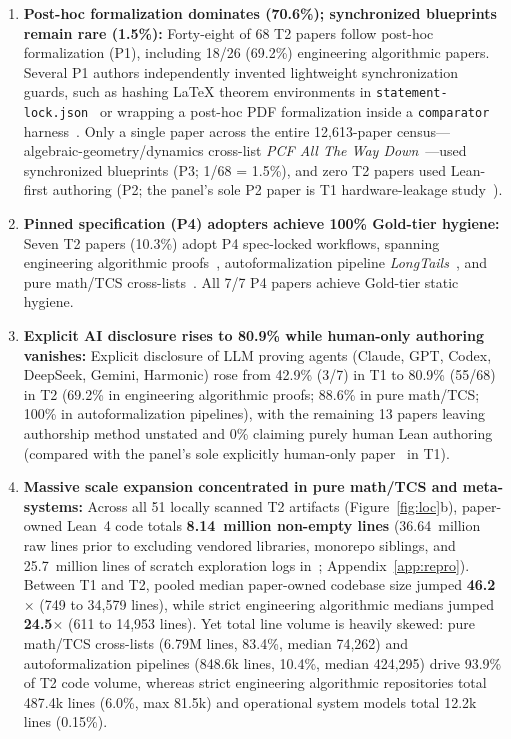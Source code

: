 \documentclass[11pt,letterpaper]{article}
\begin{document}
\begin{enumerate}
  \item \textbf{Post-hoc formalization dominates (70.6\%); synchronized blueprints remain rare (1.5\%):} Forty-eight of 68 T2 papers follow post-hoc formalization (P1), including 18/26 (69.2\%) engineering algorithmic papers. Several P1 authors independently invented lightweight synchronization guards, such as hashing \LaTeX{} theorem environments in \texttt{statement-lock.json}~\cite{arxiv2611_18455} or wrapping a post-hoc PDF formalization inside a \texttt{comparator} harness~\cite{arxiv2611_15201}. Only a single paper across the entire 12,613-paper census---algebraic-geometry/dynamics cross-list \emph{PCF All The Way Down}~\cite{arxiv2611_06106}---used synchronized blueprints (P3; 1/68 = 1.5\%), and zero T2 papers used Lean-first authoring (P2; the panel's sole P2 paper is T1 hardware-leakage study~\cite{arxiv2605_02856}).
  \item \textbf{Pinned specification (P4) adopters achieve 100\% Gold-tier hygiene:} Seven T2 papers (10.3\%) adopt P4 spec-locked workflows, spanning engineering algorithmic proofs~\cite{arxiv2611_04876,arxiv2611_11805,arxiv2611_14475}, autoformalization pipeline \emph{LongTails}~\cite{arxiv2611_13872}, and pure math/TCS cross-lists~\cite{arxiv2611_02465,arxiv2611_12862,arxiv2611_17223}. All 7/7 P4 papers achieve Gold-tier static hygiene.
  \item \textbf{Explicit AI disclosure rises to 80.9\% while human-only authoring vanishes:} Explicit disclosure of LLM proving agents (Claude, GPT, Codex, DeepSeek, Gemini, Harmonic) rose from 42.9\% (3/7) in T1 to 80.9\% (55/68) in T2 (69.2\% in engineering algorithmic proofs; 88.6\% in pure math/TCS; 100\% in autoformalization pipelines), with the remaining 13 papers leaving authorship method unstated and 0\% claiming purely human Lean authoring (compared with the panel's sole explicitly human-only paper~\cite{arxiv2605_14610} in T1).
  \item \textbf{Massive scale expansion concentrated in pure math/TCS and meta-systems:} Across all 51 locally scanned T2 artifacts (Figure~\ref{fig:loc}b), paper-owned Lean~4 code totals \textbf{8.14~million non-empty lines} (36.64~million raw lines prior to excluding vendored libraries, monorepo siblings, and 25.7~million lines of scratch exploration logs in~\cite{arxiv2611_06896}; Appendix~\ref{app:repro}). Between T1 and T2, pooled median paper-owned codebase size jumped \textbf{46.2$\times$} (749 to 34,579 lines), while strict engineering algorithmic medians jumped \textbf{24.5$\times$} (611 to 14,953 lines). Yet total line volume is heavily skewed: pure math/TCS cross-lists (6.79M lines, 83.4\%, median 74,262) and autoformalization pipelines (848.6k lines, 10.4\%, median 424,295) drive 93.9\% of T2 code volume, whereas strict engineering algorithmic repositories total 487.4k lines (6.0\%, max 81.5k) and operational system models total 12.2k lines (0.15\%).

\end{enumerate}
\end{document}
